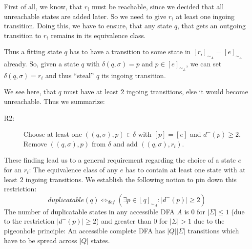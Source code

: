 First of all, we know, that $r_i$ must be reachable, since we decided that all unreachable states are added later. So we need to give $r_i$ at least one ingoing transition. Doing this, we have to ensure, that any state $q$, that gets an outgoing transition to $r_i$ remains in its equivalence class.

Thus a fitting state $q$ has to have a transition to some state in $[r_i]_{\sim_A} = [e]_{\sim_A}$ already. So, given a state $q$ with $\delta(q, \sigma) = p$ and $p \in [e]_{\sim_A}$, we can set $\delta(q, \sigma) = r_i$ and thus ``steal'' $q$ its ingoing transition.

We see here, that $q$ must have at least $2$ ingoing transitions, else it would become unreachable. Thus we summarize:
\begin{description}
	\item[R2:] Choose at least one $((q, \sigma), p) \in \delta$ with $[p] = [e]$ and $d^-(p) \geq 2$. Remove $((q, \sigma), p)$ from $\delta$ and add $((q, \sigma), r_i)$.
\end{description}
These finding lead us to a general requirement regarding the choice of a state $e$ for an $r_i$: The equivalence class of any $e$ has to contain at least one state with at least $2$ ingoing transitions. We establish the following notion to pin down this restriction:
\[
	duplicatable(q) \Leftrightarrow_{def} (\exists p \in [q]_{\sim_A}\colon |d^-(p)| \geq 2)
\]
The number of duplicatable states in any accessible DFA $A$ is $0$ for $|\Sigma| \leq 1$ (due to the restriction $|d^-(p)| \geq 2$) and greater than $0$ for $|\Sigma| > 1$ due to the pigeonhole principle: An accessible complete DFA has $|Q||\Sigma|$ transitions which have to be spread across $|Q|$ states.
%	
%	
%	
%	
%	

